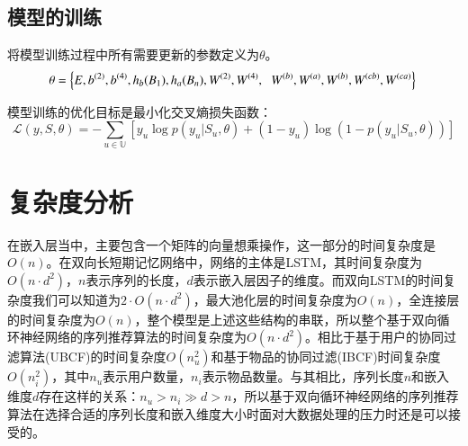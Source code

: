 \subsection{模型的训练}

将模型训练过程中所有需要更新的参数定义为$\theta $。
\begin{equation}
\theta=  \left \{ E,b^{(2)},b^{(4)},h_{b}(B_{1}),h_{a}(B_{n}),W^{(2)}, W^{(4)},\right.\\
\left.W^{(b)},W^{(a)},W^{(b)},W^{(cb)},W^{(ca)} \right \} \\
\end{equation}

模型训练的优化目标是最小化交叉熵损失函数：
\begin{equation}
\mathcal{L}(y,S,\theta )=-\sum_{u\in \mathbb{U}}[y_{u}\log p(y_{u}|S_{u},\theta)+(1-y_{u})\log (1-p(y_{u}|S_{u},\theta ))]
\end{equation}

\section{复杂度分析}

在嵌入层当中，主要包含一个矩阵的向量想乘操作，这一部分的时间复杂度是$O(n)$。在双向长短期记忆网络中，网络的主体是LSTM，其时间复杂度为$O(n\cdot d^{2})$，$n$表示序列的长度，$d$表示嵌入层因子的维度。而双向LSTM的时间复杂度我们可以知道为$2\cdot O(n\cdot d^{2})$，最大池化层的时间复杂度为$O(n)$，全连接层的时间复杂度为$O(n)$，整个模型是上述这些结构的串联，所以整个基于双向循环神经网络的序列推荐算法的时间复杂度为$O(n\cdot d^{2})$。相比于基于用户的协同过滤算法(UBCF)的时间复杂度$O(n_{u}^{2})$和基于物品的协同过滤(IBCF)时间复杂度$O(n_{i}^{2})$，其中$n_{u}$表示用户数量，$n_{i}$表示物品数量。与其相比，序列长度$n$和嵌入维度$d$存在这样的关系：$n_{u}> n_{i}\gg d> n$，所以基于双向循环神经网络的序列推荐算法在选择合适的序列长度和嵌入维度大小时面对大数据处理的压力时还是可以接受的。





